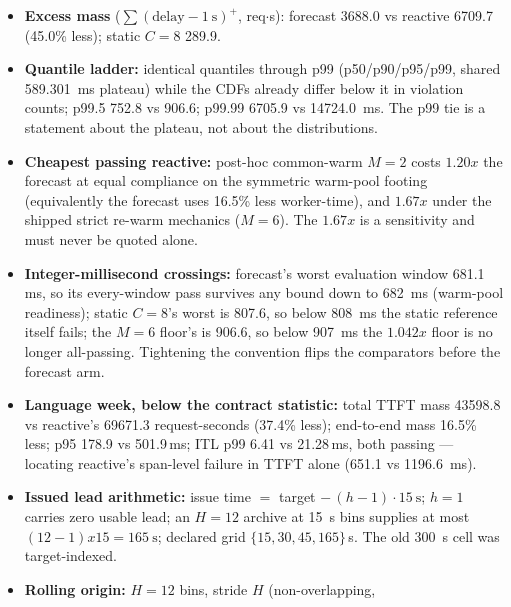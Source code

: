 \documentclass[11pt,a4paper]{article}
\def\times{x}\def\rho{rho}\def\approx{~}\def\leq{<=}\def\geq{>=}%
\def\emph#1{#1}\def\texttt#1{#1}%
\begin{document}
\begin{itemize}
  (7.7\%); static $C{=}8$ \num{25536.9}; warm floor $M{=}2$ \num{28343.3} at
  769.3 worker-hours. The floor interpolated to the forecast's delay burden
  costs 754.4 worker-hours, 12.6\% more.
\item \textbf{Excess mass} ($\sum(\text{delay}-\SI{1}{\second})^{+}$,
  req$\cdot$s): forecast \num{3688.0} vs reactive \num{6709.7} (45.0\% less);
  static $C{=}8$ \num{289.9}.
\item \textbf{Quantile ladder:} identical quantiles through p99
  (p50/p90/p95/p99, shared \SI{589.301}{\milli\second} plateau) while the CDFs
  already differ below it in violation counts; p99.5 752.8 vs 906.6; p99.99
  \num{6705.9} vs \SI{14724.0}{\milli\second}. The p99 tie is a statement
  about the plateau, not about the distributions.
\item \textbf{Cheapest passing reactive:} post-hoc common-warm $M{=}2$ costs
  $1.20\times$ the forecast at equal compliance on the symmetric warm-pool
  footing (equivalently the forecast uses 16.5\% less worker-time), and
  $1.67\times$ under the shipped strict re-warm mechanics ($M{=}6$). The
  $1.67\times$ is a sensitivity and \emph{must never be quoted alone}.
\item \textbf{Integer-millisecond crossings:} forecast's worst evaluation
  window \num{681.1}\,ms, so its every-window pass survives any bound down to
  \SI{682}{\milli\second} (warm-pool readiness); static $C{=}8$'s worst is
  \num{807.6}, so below \SI{808}{\milli\second} the static reference itself
  fails; the $M{=}6$ floor's is \num{906.6}, so below
  \SI{907}{\milli\second} the $1.042\times$ floor is no longer all-passing.
  Tightening the convention flips the comparators \emph{before} the forecast
  arm.
\item \textbf{Language week, below the contract statistic:} total TTFT mass
  \num{43598.8} vs reactive's \num{69671.3} request-seconds (37.4\% less);
  end-to-end mass 16.5\% less; p95 \num{178.9} vs \num{501.9}\,ms; ITL p99
  6.41 vs 21.28\,ms, both passing --- locating reactive's span-level failure
  in TTFT alone (651.1 vs \SI{1196.6}{\milli\second}).
\item \textbf{Issued lead arithmetic:} issue time $=$ target
  $-\,(h{-}1)\cdot\SI{15}{\second}$; $h{=}1$ carries \emph{zero} usable lead;
  an $H{=}12$ archive at \SI{15}{\second} bins supplies at most
  $(12{-}1)\times15 = \SI{165}{\second}$; declared grid
  $\{15,30,45,165\}$\,s. The old \SI{300}{\second} cell was target-indexed.
\item \textbf{Rolling origin:} $H{=}12$ bins, stride $H$ (non-overlapping,

\end{itemize}
\end{document}
